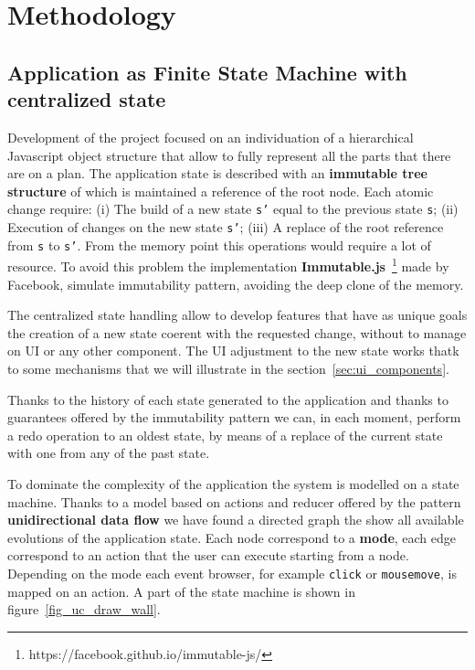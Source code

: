 \section{Methodology}\label{sec:methodology}

\subsection{Application as Finite State Machine with centralized state}\label{sec:central_state}

Development of the project focused on an individuation of a hierarchical Javascript object structure that allow to fully represent all the parts that there are on a plan. The application state is described with an \textbf{immutable tree structure} of which is maintained a reference of the root node. Each atomic change require: (i) The build of a new state \texttt{s'} equal to the previous state \texttt{s}; (ii) Execution of changes on the new state \texttt{s'}; (iii) A replace of the root reference from \texttt{s} to \texttt{s'}. From the memory point this operations would require a lot of resource. To avoid this problem the implementation \textbf{Immutable.js}~\footnote{https://facebook.github.io/immutable-js/} made by Facebook, simulate immutability pattern, avoiding the deep clone of the memory.

The centralized state handling allow to develop features that have as unique goals the creation of a new state coerent with the requested change, without to manage on UI or any other component. The UI adjustment to the new state works thatk to some mechanisms that we will illustrate in the section~\ref{sec:ui_components}.

Thanks to the history of each state generated to the application and thanks to guarantees offered by the immutability pattern we can, in each moment, perform a redo operation to an oldest state, by means of a replace of the current state with one from any of the past state.

To dominate the complexity of the application the system is modelled on a state machine. Thanks to a model based on actions and reducer offered by the pattern \textbf{unidirectional data flow} we have found a directed graph the show all available evolutions of the application state. Each node correspond to a \textbf{mode}, each edge correspond to an action that the user can execute starting from a node. Depending on the mode each event browser, for example \texttt{click} or \texttt{mousemove}, is mapped on an action. A part of the state machine is shown in figure~\ref{fig_uc_draw_wall}.

